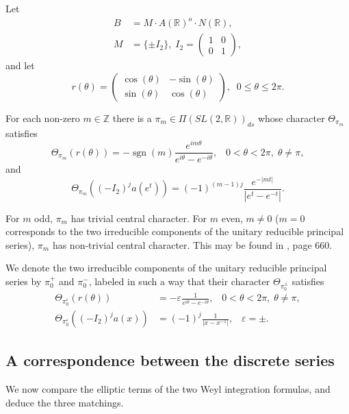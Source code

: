 \documentclass[12pt,letterpaper]{book}
\theoremstyle{plain}
\theoremstyle{definition}
\theoremstyle{remark}
\theoremstyle{remark}
\DeclareMathOperator{\sgn}{sgn}
\begin{document}
Let
\begin{align*}
B &=M\cdot A(\mathbb{R})^o\cdot N(\mathbb{R}), \\
M &=\{\pm I_2\},\;I_2=\left(
\begin{array}{cc}
1 & 0 \\
0 & 1
\end{array}
\right) ,
\end{align*}
and let
\[
r(\theta )=\left(
\begin{array}{cc}
\cos (\theta ) & -\sin (\theta ) \\
\sin (\theta ) & \cos (\theta )
\end{array}
\right) ,\;\;0\leq \theta \leq 2\pi .
\]

For each non-zero $m\in \mathbb{Z}$ there is a $\pi _m\in \Pi (SL(2,\mathbb{R}%
))_{ds}$ whose character $\Theta _{\pi _m}$ satisfies
\[
\Theta _{\pi _m}(r(\theta ))=-\sgn(m)
\frac{e^{im\theta }}{e^{i\theta }-e^{-i\theta }},
\;\;\;0<\theta <2\pi ,\;\theta \neq \pi ,
\]
and
\[
\Theta _{\pi _m}((-I_2)^j a(e^t ))=(-1)^{(m-1)j}
\frac{e^{-|mt| }}{|e^t-e^{-t}|}.
\]

For $m$ odd, $\pi _m$ has trivial central character. For $m$ even, $m\neq 0$
($m=0$ corresponds to the two irreducible components of the unitary
reducible principal series), $\pi _m$ has non-trivial central character.
This may be found in \cite{HC2}, page 660.

We denote the two irreducible components of the unitary reducible principal
series by $\pi _0^{+}$ and $\pi _0^{-}$, labeled in such a way that their
character $\Theta _{\pi _0^{\pm }}$ satisfies
\begin{align*}
\Theta _{\pi _0^\varepsilon }(r(\theta )) &=-\varepsilon \frac 1{e^{i\theta
}-e^{-i\theta }},\;\;\;0<\theta <2\pi ,\;\theta \neq \pi , \\
\Theta _{\pi _0^\varepsilon }((-I_2)^ja(x)) &=(-1)^j\frac
1{|x-x^{-1}|},\;\;\;\varepsilon =\pm .
\end{align*}

\subsection{A correspondence between the discrete series}

We now compare the elliptic terms of the two Weyl integration formulas, and deduce the three matchings.
\end{document}
